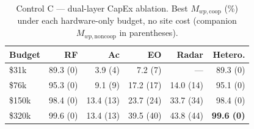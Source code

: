 \begin{table}[t]
\centering
\caption{Control C --- dual-layer CapEx ablation. Best $M_{wp,\mathrm{coop}}$ (\%) under each hardware-only budget, no site cost (companion $M_{wp,\mathrm{noncoop}}$ in parentheses).}
\label{tab:modality_ablation_dual_coop}
\setlength{\tabcolsep}{3pt}
\begin{tabular}{lrrrrr}
\toprule
Budget & RF & Ac & EO & Radar & Hetero. \\
\midrule
\$31k & 89.3 (0) & 3.9 (4) & 7.2 (7) & --- & 89.3 (0) \\
\$76k & 95.3 (0) & 9.1 (9) & 17.2 (17) & 14.0 (14) & 95.1 (0) \\
\$150k & 98.4 (0) & 13.4 (13) & 23.7 (24) & 33.7 (34) & 98.4 (0) \\
\$320k & 99.6 (0) & 13.4 (13) & 39.5 (40) & 43.8 (44) & \textbf{99.6 (0)} \\
\bottomrule
\end{tabular}
\end{table}
